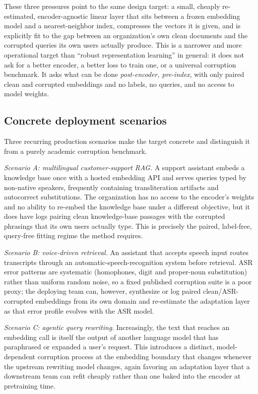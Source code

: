 These three pressures point to the same design target: a small,
cheaply re-estimated, encoder-agnostic linear layer that sits between a
frozen embedding model and a nearest-neighbor index, compresses the vectors
it is given, and is explicitly fit to the gap between an organization's own
clean documents and the corrupted queries its own users actually produce.
This is a narrower and more operational target than ``robust
representation learning'' in general: it does not ask for a better encoder,
a better loss to train one, or a universal corruption benchmark. It asks
what can be done \emph{post-encoder, pre-index}, with only paired clean and
corrupted embeddings and no labels, no queries, and no access to model
weights.

\subsection{Concrete deployment scenarios}
\label{sec:scenarios}

Three recurring production scenarios make the target concrete and
distinguish it from a purely academic corruption benchmark.

\emph{Scenario A: multilingual customer-support RAG.} A support assistant
embeds a knowledge base once with a hosted embedding API and serves queries
typed by non-native speakers, frequently containing transliteration
artifacts and autocorrect substitutions. The organization has no access to
the encoder's weights and no ability to re-embed the knowledge base under a
different objective, but it does have logs pairing clean knowledge-base
passages with the corrupted phrasings that its own users actually type.
This is precisely the paired, label-free, query-free fitting regime the
method requires.

\emph{Scenario B: voice-driven retrieval.} An assistant that accepts speech
input routes transcripts through an automatic-speech-recognition system
before retrieval. ASR error patterns are systematic (homophones, digit and
proper-noun substitution) rather than uniform random noise, so a fixed
published corruption suite is a poor proxy; the deploying team can, however,
synthesize or log paired clean/ASR-corrupted embeddings from its own
domain and re-estimate the adaptation layer as that error profile evolves
with the ASR model.

\emph{Scenario C: agentic query rewriting.} Increasingly, the text that
reaches an embedding call is itself the output of another language model
that has paraphrased or expanded a user's request. This introduces a
distinct, model-dependent corruption process at the embedding boundary
that changes whenever the upstream rewriting model changes, again favoring
an adaptation layer that a downstream team can refit cheaply rather than
one baked into the encoder at pretraining time.

